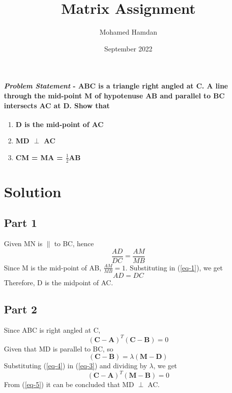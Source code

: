 \documentclass[journal,10pt,twocolumn]{article}
\title{\textbf{Matrix Assignment}}
\author{Mohamed Hamdan}
\date{September 2022}
\begin{document}
\maketitle
\paragraph{\textit{Problem Statement} - ABC is a triangle right angled at C. A line through the mid-point M of hypotenuse AB and parallel to BC intersects AC at D. Show that}
\begin{enumerate}
	\item \textbf{D is the mid-point of AC}
	\item \textbf{MD $\perp$ AC}
	\item \textbf{CM = MA = $\frac{1}{2}$AB}
\end{enumerate}

\section*{Solution}
\subsection*{Part 1}
Given MN is $\parallel$ to BC, hence\\
\begin{equation}
\frac{AD}{DC} = \frac{AM}{MB}
\label{eq-1}
\end{equation}
Since M is the mid-point of AB, $\frac{AM}{MB} = 1$. Substituting in (\ref{eq-1}), we get\\
\begin{equation}
AD = DC
\label{eq-2}
\end{equation}
Therefore, D is the midpoint of AC.
\subsection*{Part 2}
Since ABC is right angled at C,
\begin{equation}
(\boldsymbol{C-A})^T(\boldsymbol{C-B}) = 0	
\label{eq-3}
\end{equation}
Given that MD is parallel to BC, so
\begin{equation}
(\boldsymbol{C-B}) = \lambda(\boldsymbol{M-D})
\label{eq-4}
\end{equation}
Substituting (\ref{eq-4}) in (\ref{eq-3}) and dividing by $\lambda$, we get
\begin{equation}
(\boldsymbol{C-A})^T(\boldsymbol{M-B}) = 0	
\label{eq-5}
\end{equation}
From (\ref{eq-5}) it can be concluded that MD $\perp$ AC.
\end{document}
